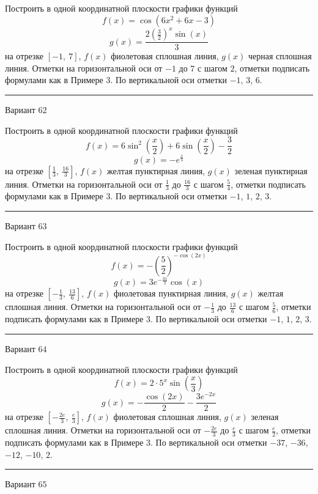 \documentclass[11pt]{report}
\begin{document}
Построить в одной координатной плоскости графики функций $$f(x) = \cos{\left(6 x^{2} + 6 x - 3 \right)}$$ $$g(x) = \frac{2 \left(\frac{3}{2}\right)^{x} \sin{\left(x \right)}}{3}$$ на отрезке $\left[-1, \  7\right]$, $f(x)$ фиолетовая сплошная линия, $g(x)$ черная сплошная линия. Отметки на горизонтальной оси от $-1$ до $7$ с шагом $2$, отметки подписать формулами как в Примере 3. По вертикальной оси отметки $-1$, $3$, $6$.
\begin{center}
\noindent\rule{8cm}{0.4pt}
\end{center}
Вариант $62$


Построить в одной координатной плоскости графики функций $$f(x) = 6 \sin^{2}{\left(\frac{x}{2} \right)} + 6 \sin{\left(\frac{x}{2} \right)} - \frac{3}{2}$$ $$g(x) = - e^{\frac{x}{3}}$$ на отрезке $\left[\frac{1}{3}, \  \frac{16}{3}\right]$, $f(x)$ желтая пунктирная линия, $g(x)$ зеленая пунктирная линия. Отметки на горизонтальной оси от $\frac{1}{3}$ до $\frac{16}{3}$ с шагом $\frac{5}{4}$, отметки подписать формулами как в Примере 3. По вертикальной оси отметки $-1$, $1$, $2$, $3$.
\begin{center}
\noindent\rule{8cm}{0.4pt}
\end{center}
Вариант $63$


Построить в одной координатной плоскости графики функций $$f(x) = - \left(\frac{5}{2}\right)^{- \cos{\left(2 x \right)}}$$ $$g(x) = 3 e^{- \frac{3 x}{2}} \cos{\left(x \right)}$$ на отрезке $\left[- \frac{1}{3}, \  \frac{13}{6}\right]$, $f(x)$ фиолетовая пунктирная линия, $g(x)$ желтая сплошная линия. Отметки на горизонтальной оси от $- \frac{1}{3}$ до $\frac{13}{6}$ с шагом $\frac{5}{6}$, отметки подписать формулами как в Примере 3. По вертикальной оси отметки $-1$, $1$, $2$, $3$.
\begin{center}
\noindent\rule{8cm}{0.4pt}
\end{center}
Вариант $64$


Построить в одной координатной плоскости графики функций $$f(x) = 2 \cdot 5^{x} \sin{\left(\frac{x}{3} \right)}$$ $$g(x) = - \frac{\cos{\left(2 x \right)}}{2} - \frac{3 e^{- 2 x}}{2}$$ на отрезке $\left[- \frac{2 e}{3}, \  \frac{e}{3}\right]$, $f(x)$ фиолетовая сплошная линия, $g(x)$ зеленая сплошная линия. Отметки на горизонтальной оси от $- \frac{2 e}{3}$ до $\frac{e}{3}$ с шагом $\frac{e}{2}$, отметки подписать формулами как в Примере 3. По вертикальной оси отметки $-37$, $-36$, $-12$, $-10$, $2$.
\begin{center}
\noindent\rule{8cm}{0.4pt}
\end{center}
Вариант $65$
\end{document}
